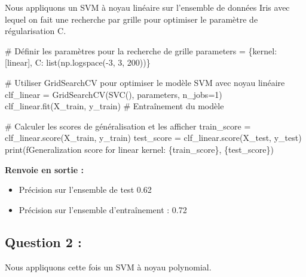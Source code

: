 \documentclass[
  letterpaper,
  DIV=11,
  numbers=noendperiod]{scrartcl}
\newenvironment{Shaded}{\begin{snugshade}}{\end{snugshade}}
\newcommand{\BuiltInTok}[1]{\textcolor[rgb]{0.00,0.23,0.31}{#1}}
\newcommand{\CommentTok}[1]{\textcolor[rgb]{0.37,0.37,0.37}{#1}}
\newcommand{\DecValTok}[1]{\textcolor[rgb]{0.68,0.00,0.00}{#1}}
\newcommand{\NormalTok}[1]{\textcolor[rgb]{0.00,0.23,0.31}{#1}}
\newcommand{\OperatorTok}[1]{\textcolor[rgb]{0.37,0.37,0.37}{#1}}
\newcommand{\SpecialCharTok}[1]{\textcolor[rgb]{0.37,0.37,0.37}{#1}}
\newcommand{\SpecialStringTok}[1]{\textcolor[rgb]{0.13,0.47,0.30}{#1}}
\newcommand{\StringTok}[1]{\textcolor[rgb]{0.13,0.47,0.30}{#1}}
\providecommand{\tightlist}{%
  \setlength{\itemsep}{0pt}\setlength{\parskip}{0pt}}\usepackage{longtable,booktabs,array}
\begin{document}
Nous appliquons un SVM à noyau linéaire sur l'ensemble de données Iris
avec lequel on fait une recherche par grille pour optimiser le paramètre
de régularisation C.

\begin{Shaded}
\begin{Highlighting}[]
\CommentTok{\# Définir les paramètres pour la recherche de grille}
\NormalTok{parameters }\OperatorTok{=}\NormalTok{ \{}\StringTok{\textquotesingle{}kernel\textquotesingle{}}\NormalTok{: [}\StringTok{\textquotesingle{}linear\textquotesingle{}}\NormalTok{], }\StringTok{\textquotesingle{}C\textquotesingle{}}\NormalTok{: }\BuiltInTok{list}\NormalTok{(np.logspace(}\OperatorTok{{-}}\DecValTok{3}\NormalTok{, }\DecValTok{3}\NormalTok{, }\DecValTok{200}\NormalTok{))\}}

\CommentTok{\# Utiliser GridSearchCV pour optimiser le modèle SVM avec noyau linéaire}
\NormalTok{clf\_linear }\OperatorTok{=}\NormalTok{ GridSearchCV(SVC(), parameters, n\_jobs}\OperatorTok{=}\DecValTok{1}\NormalTok{)}
\NormalTok{clf\_linear.fit(X\_train, y\_train)  }\CommentTok{\# Entraînement du modèle}

\CommentTok{\# Calculer les scores de généralisation et les afficher}
\NormalTok{train\_score }\OperatorTok{=}\NormalTok{ clf\_linear.score(X\_train, y\_train)}
\NormalTok{test\_score }\OperatorTok{=}\NormalTok{ clf\_linear.score(X\_test, y\_test)}
\BuiltInTok{print}\NormalTok{(}\SpecialStringTok{f\textquotesingle{}Generalization score for linear kernel: }\SpecialCharTok{\{}\NormalTok{train\_score}\SpecialCharTok{\}}\SpecialStringTok{, }\SpecialCharTok{\{}\NormalTok{test\_score}\SpecialCharTok{\}}\SpecialStringTok{\textquotesingle{}}\NormalTok{)}
\end{Highlighting}
\end{Shaded}

\textbf{Renvoie en sortie :}

\begin{itemize}
\tightlist
\item
  Précision sur l'ensemble de test 0.62
\item
  Précision sur l'ensemble d'entraînement : 0.72
\end{itemize}

\hypertarget{question-2}{%
\subsection{Question 2 :}\label{question-2}}

Nous appliquons cette fois un SVM à noyau polynomial.
\end{document}
